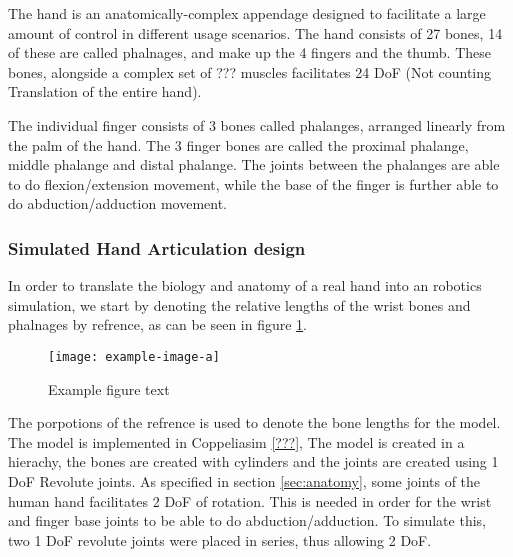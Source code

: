 \documentclass[../main.tex]{subfiles}
\begin{document}
The hand is an anatomically-complex appendage designed to facilitate a large amount of control in different usage scenarios.
The hand consists of 27 bones, 14 of these are called phalnages, and make up the 4 fingers and the thumb. These bones, alongside a complex set of ??? muscles facilitates 24 DoF (Not counting Translation of the entire hand).

The individual finger consists of 3 bones called \gls{phalanges}, arranged linearly from the palm of the hand.
The 3 finger bones are called the proximal phalange, middle phalange and distal phalange.
The joints between the phalanges are able to do \gls{flexion/extension} movement, while the base of the finger is further able to do \gls{abduction/adduction} movement.


\subsubsection{Simulated Hand Articulation design}

In order to translate the biology and anatomy of a real hand into an robotics simulation, we start by denoting the relative lengths of the wrist bones and phalnages by refrence, as can be seen in figure \ref{fig:handref}.

\begin{figure}[h]
\begin{center}
\texttt{[image: example-image-a]}
\caption{Example figure text}
\label{fig:handref}
\end{center}
\end{figure}


The porpotions of the refrence is used to denote the bone lengths for the model.
The model is implemented in Coppeliasim \ref{???}, The model is created in a hierachy, the bones are created with cylinders and the joints are created using 1 DoF Revolute joints.
As specified in section \ref{sec:anatomy}, some joints of the human hand facilitates 2 DoF of rotation.
This is needed in order for the wrist and finger base joints to be able to do \gls{abduction/adduction}.
To simulate this, two 1 DoF revolute joints were placed in series, thus allowing 2 DoF.
\end{document}
